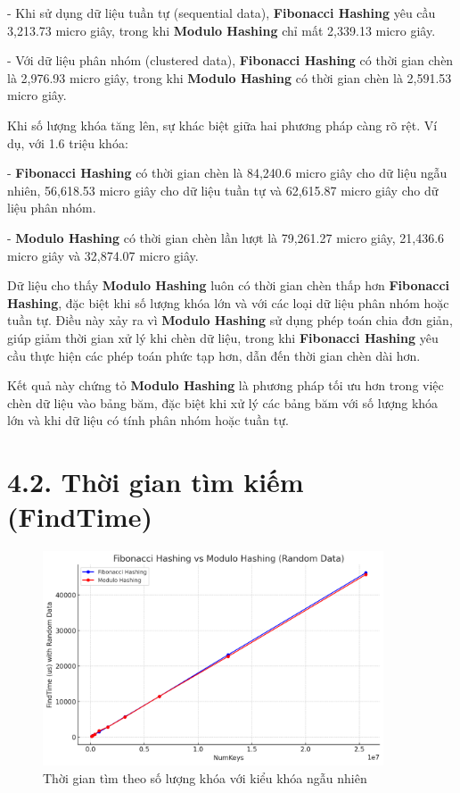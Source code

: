 \documentclass[12pt,a4paper]{report}
\begin{document}
    - Khi sử dụng dữ liệu tuần tự (sequential data), \textbf{Fibonacci Hashing} yêu cầu 3,213.73 micro giây, trong khi \textbf{Modulo Hashing} chỉ mất 2,339.13 micro giây.
    
    - Với dữ liệu phân nhóm (clustered data), \textbf{Fibonacci Hashing} có thời gian chèn là 2,976.93 micro giây, trong khi \textbf{Modulo Hashing} có thời gian chèn là 2,591.53 micro giây.

Khi số lượng khóa tăng lên, sự khác biệt giữa hai phương pháp càng rõ rệt. Ví dụ, với 1.6 triệu khóa:

    - \textbf{Fibonacci Hashing} có thời gian chèn là 84,240.6 micro giây cho dữ liệu ngẫu nhiên, 56,618.53 micro giây cho dữ liệu tuần tự và 62,615.87 micro giây cho dữ liệu phân nhóm.
    
    - \textbf{Modulo Hashing} có thời gian chèn lần lượt là 79,261.27 micro giây, 21,436.6 micro giây và 32,874.07 micro giây.


Dữ liệu cho thấy \textbf{Modulo Hashing} luôn có thời gian chèn thấp hơn \textbf{Fibonacci Hashing}, đặc biệt khi số lượng khóa lớn và với các loại dữ liệu phân nhóm hoặc tuần tự. Điều này xảy ra vì \textbf{Modulo Hashing} sử dụng phép toán chia đơn giản, giúp giảm thời gian xử lý khi chèn dữ liệu, trong khi \textbf{Fibonacci Hashing} yêu cầu thực hiện các phép toán phức tạp hơn, dẫn đến thời gian chèn dài hơn.

Kết quả này chứng tỏ \textbf{Modulo Hashing} là phương pháp tối ưu hơn trong việc chèn dữ liệu vào bảng băm, đặc biệt khi xử lý các bảng băm với số lượng khóa lớn và khi dữ liệu có tính phân nhóm hoặc tuần tự.

\section*{4.2. Thời gian tìm kiếm (FindTime)}
\begin{figure}[!ht]
    \centering
    \includegraphics[width=0.9\textwidth]{find_random.png}
    \caption{Thời gian tìm theo số lượng khóa với kiểu khóa ngẫu nhiên}
    \label{fig:find_random}
\end{figure}
\end{document}
